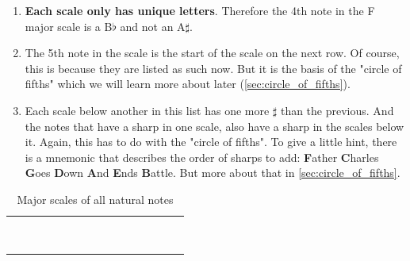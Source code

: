 \begin{enumerate}
	\item \textbf{Each scale only has unique letters}. Therefore the 4th note in the F major scale is a B$\flat$ and not an A$\sharp$.
	\item The 5th note in the scale is the start of the scale on the next row. Of course, this is because they are listed as such now. But it is the basis of the "circle of fifths" which we will learn more about later (\autoref{sec:circle_of_fifths}).
	\item Each scale below another in this list has one more $\sharp$ than the previous. And the notes that have a sharp in one scale, also have a sharp in the scales below it. Again, this has to do with the "circle of fifths". To give a little hint, there is a mnemonic that describes the order of sharps to add: \textbf{F}ather \textbf{C}harles \textbf{G}oes \textbf{D}own \textbf{A}nd \textbf{E}nds \textbf{B}attle. But more about that in \autoref{sec:circle_of_fifths}.
\end{enumerate}

\begin{table}[h]
	\centering
	\begin{NiceTabular}{*{16}{P{0.05mm}}}
		\Block{}{} &  & &  & &  & &  & &  & &  & &  & & \Block{}{} \\
		 & &  & &  & &  & &  & &  & &  & &  & \\
		 & &  & &  & &  & &  & &  & &  & &  & \\
		 & &  & &  & &  & &  & &  & &  & &  & \\
		 & &  & &  & &  & &  & &  & &  & &  & \\
		 & &  & &  & &  & &  & &  & &  & &  & \\
		 & &  & &  & &  & &  & &  & &  & &  & \\
		 & &  & &  & &  & &  & &  & &  & &  & \\
		 & &  & &  & &  & &  & &  & &  & &  & 
	\end{NiceTabular}
	\caption{Major scales of all natural notes}
	\label{tab:guitar_natural_note_major_scale}
\end{table}

